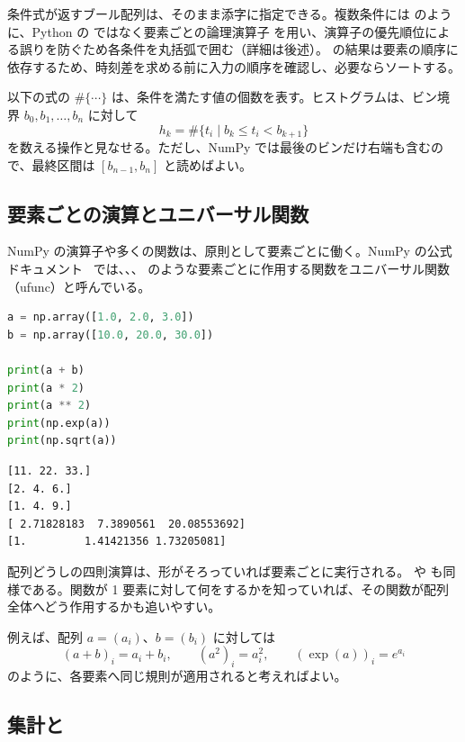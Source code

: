 条件式が返すブール配列は、そのまま添字に指定できる。複数条件には  のように、Python の  ではなく要素ごとの論理演算子 \code{\&} を用い、演算子の優先順位による誤りを防ぐため各条件を丸括弧で囲む（詳細は後述）。 の結果は要素の順序に依存するため、時刻差を求める前に入力の順序を確認し、必要ならソートする。

以下の式の \(\#\{\cdots\}\) は、条件を満たす値の個数を表す。ヒストグラムは、ビン境界 \(b_0, b_1, \dots, b_n\) に対して
\[
h_k = \#\{ t_i \mid b_k \le t_i < b_{k+1} \}
\]
を数える操作と見なせる。ただし、NumPy では最後のビンだけ右端も含むので、最終区間は \([b_{n-1}, b_n]\) と読めばよい。

\subsection{要素ごとの演算とユニバーサル関数}

NumPy の演算子や多くの関数は、原則として要素ごとに働く。NumPy の公式ドキュメント~\cite{numpy_docs} では、、、 のような要素ごとに作用する関数をユニバーサル関数（ufunc）と呼んでいる。

\begin{lstlisting}[language=Python]
a = np.array([1.0, 2.0, 3.0])
b = np.array([10.0, 20.0, 30.0])

print(a + b)
print(a * 2)
print(a ** 2)
print(np.exp(a))
print(np.sqrt(a))
\end{lstlisting}

\begin{lstlisting}[numbers=none, xleftmargin=2\zw]
[11. 22. 33.]
[2. 4. 6.]
[1. 4. 9.]
[ 2.71828183  7.3890561  20.08553692]
[1.         1.41421356 1.73205081]
\end{lstlisting}

配列どうしの四則演算は、形がそろっていれば要素ごとに実行される。 や  も同様である。関数が 1 要素に対して何をするかを知っていれば、その関数が配列全体へどう作用するかも追いやすい。

例えば、配列 \(a = (a_i)\)、\(b = (b_i)\) に対しては
\[
(a+b)_i = a_i + b_i,\qquad
(a^2)_i = a_i^2,\qquad
(\exp(a))_i = e^{a_i}
\]
のように、各要素へ同じ規則が適用されると考えればよい。

\subsection{集計と }

